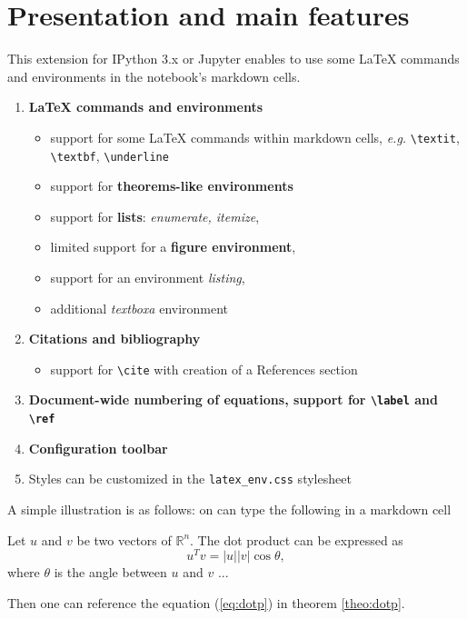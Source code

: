     \section{Presentation and main
features}\label{presentation-and-main-features}

    This extension for IPython 3.x or Jupyter enables to use some LaTeX
commands and environments in the notebook's markdown cells.
\begin{enumerate}
\item \textbf{LaTeX commands and
environments}
\begin{itemize}
\item support for some
LaTeX commands within markdown cells, \emph{e.g.}
\texttt{\textbackslash{}textit}, \texttt{\textbackslash{}textbf},
\texttt{\textbackslash{}underline}
\item support for
\textbf{theorems-like environments}
\item support for \textbf{lists}:
\emph{enumerate, itemize}, 
\item limited support for a
\textbf{figure environment},
\item support for an environment
\emph{listing},
\item additional \emph{textboxa}
environment
\end{itemize}
\item \textbf{Citations and
bibliography}
\begin{itemize}
\item support for
\texttt{\textbackslash{}cite} with creation of a References
section
\end{itemize}
\item \textbf{Document-wide
numbering of equations, support for \texttt{\textbackslash{}label} and
\texttt{\textbackslash{}ref}}
\item \textbf{Configuration
toolbar}
\item Styles can be customized in the
\texttt{latex\_env.css} stylesheet
\end{enumerate}

A simple illustration is as follows: on can type the following in a
markdown cell

\begin{listing}
\begin{theorem} \label{theo:dotp}
Let $u$ and $v$ be two vectors of $\mathbb{R}^n$. The dot product can be expressed as
\begin{equation}
\label{eq:dotp}
u^Tv = |u||v| \cos \theta,
\end{equation}
where $\theta$ is the angle between $u$ and $v$ ...
\end{theorem}
Then one can reference the equation (\ref{eq:dotp}) in theorem \ref{theo:dotp}.
\end{listing}

